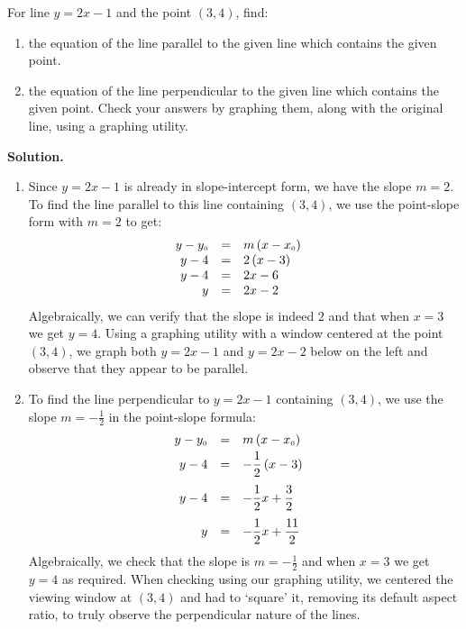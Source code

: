 \documentclass{ximera}
\begin{document}
\begin{ex}  For line $y = 2x-1$ and the point $(3,4)$, find:

\begin{enumerate}

\item the equation of the line parallel to the given line which contains the given point.

\item   the equation of the line perpendicular to the given line which contains the given point.  Check your answers by graphing them, along with the original line, using a graphing utility.

\end{enumerate}

{\bf Solution.}

\begin{enumerate}

\item Since $y = 2x-1$ is already in slope-intercept form, we have the slope $m = 2$.  To find the line parallel to this line containing $(3,4)$, we use the point-slope form with $m = 2$ to get: \[\begin{array}{rclr} 
y - y_{\mbox{\tiny$0$}} & = & m\left(x - x_{\mbox{\tiny$0$}}\right)  & \\
y - 4 & = & 2 \left(x - 3\right) & \\
y - 4 & = & 2x - 6 & \\
y& = & 2x-2\\
\end{array} \] Algebraically, we can verify that the slope is indeed $2$ and that when $x =3$ we get $y = 4$.  Using a graphing utility with a window centered at the point $(3, 4)$,  we graph both $y = 2x-1$ and $y = 2x-2$ below on the left and observe that they appear to be parallel.

\item To find the line perpendicular to $y = 2x-1$ containing $(3,4)$, we use the slope $m = -\frac{1}{2}$ in the point-slope formula:\[\begin{array}{rclr} 
y - y_{\mbox{\tiny$0$}} & = & m\left(x - x_{\mbox{\tiny$0$}}\right)  & \\ [3pt]
y - 4 & = & -\dfrac{1}{2} \left(x - 3\right) & \\ [10pt]
y - 4 & = & -\dfrac{1}{2} x + \dfrac{3}{2} & \\ [10pt]
y& = & -\dfrac{1}{2} x + \dfrac{11}{2}\\
\end{array} \]  Algebraically, we check that the slope is $m = -\frac{1}{2}$ and when $x = 3$ we get $y = 4$ as required.  When checking using our graphing utility, we centered the viewing window at $(3, 4)$ and had to `square' it, removing its default aspect ratio, to truly observe the perpendicular nature of the lines.


\end{enumerate}
\end{ex}
\end{document}
